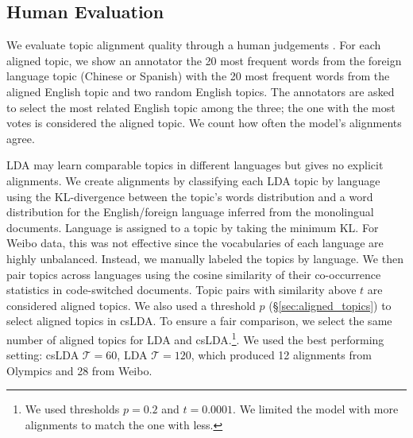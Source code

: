 \documentclass[11pt]{article}
\begin{document}
\subsection{Human Evaluation}
We evaluate topic alignment quality through a human judgements \cite{chang2009reading}.
For each aligned topic, we show an annotator the 20 most frequent words from the foreign language topic (Chinese or Spanish)
with the 20 most frequent words from the aligned English topic and two random English topics.
The annotators are asked to select the most related English topic among the three; the one with the most votes is 
considered the aligned topic. We count how often the model's alignments agree.

LDA may learn comparable topics in different languages
but gives no explicit alignments. 
We create alignments 
by classifying each LDA topic by language using the KL-divergence between the topic's words distribution and a word distribution
for the English/foreign language inferred from the monolingual documents.
Language is assigned to a topic by taking the minimum KL. For Weibo data, this was not effective since the vocabularies
of each language are highly unbalanced. Instead, we manually labeled the topics by language.
We then pair topics across languages using the cosine similarity of their co-occurrence statistics in code-switched documents. 
Topic pairs with similarity above $t$ are considered aligned topics. We also used a threshold $p$ (\S \ref{sec:aligned_topics})
to select aligned topics in csLDA.
To ensure a fair comparison, we select the same number of aligned topics for LDA and csLDA.\footnote{We used thresholds $p = 0.2$ and $t = 0.0001$. We limited the model with more alignments to match the one with less.}.
We used the best performing setting: csLDA $\mathcal{T}$$=$$60$, LDA $\mathcal{T}$$=$$120$, which produced
12 alignments from Olympics and 28 from Weibo.

\end{document}
